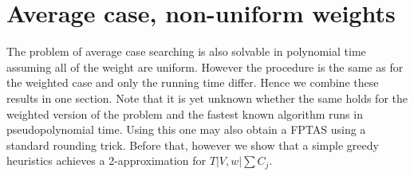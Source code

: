 \newpage
\section{Average case, non-uniform weights}
The problem of average case searching is also solvable in polynomial time assuming all of the weight are uniform. However the procedure is the same as for the weighted case and only the running time differ. Hence we combine these results in one section. Note that it is yet unknown whether the same holds for the weighted version of the problem and the fastest known algorithm runs in pseudopolynomial time. Using this one may also obtain a FPTAS using a standard rounding trick. Before that, however we show that a simple greedy heuristics achieves a 2-approximation for $T|V,w|\sum C_j$.


